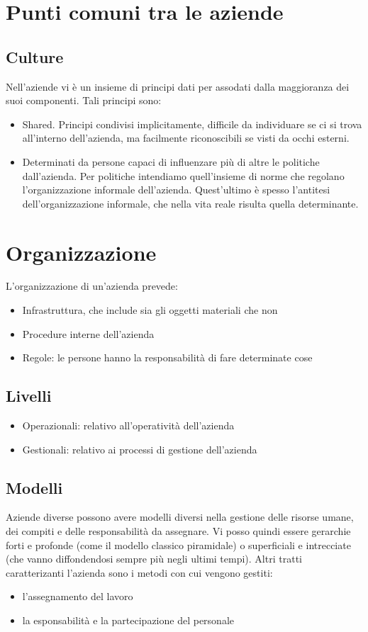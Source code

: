 \section{Punti comuni tra le aziende}
\subsection{Culture}
Nell'aziende vi \`e un insieme di principi dati per assodati dalla maggioranza dei suoi componenti. Tali principi sono:
\begin{itemize}
\item Shared. Principi condivisi implicitamente, difficile da individuare se ci si trova all'interno dell'azienda, ma facilmente riconoscibili se visti da occhi esterni.
\item Determinati da persone capaci di influenzare pi\`u di altre le politiche dall'azienda. Per politiche intendiamo quell'insieme di norme che regolano l'organizzazione informale dell'azienda.
Quest'ultimo \`e spesso l'antitesi dell'organizzazione informale, che nella vita reale risulta quella determinante.
\end{itemize}
\section{Organizzazione}
L'organizzazione di un'azienda prevede:
\begin{itemize}
	\item Infrastruttura, che include sia gli oggetti materiali che non
	\item Procedure interne dell'azienda
	\item Regole: le persone hanno la responsabilit\`a di fare determinate cose
\end{itemize}
\subsection{Livelli}
\begin{itemize}
	\item Operazionali: relativo all'operativit\`a dell'azienda
	\item Gestionali: relativo ai processi di gestione dell'azienda
\end{itemize}
\subsection{Modelli}
Aziende diverse possono avere modelli diversi nella gestione delle risorse umane, dei compiti e delle responsabilit\`a da assegnare. Vi posso quindi essere gerarchie forti e profonde (come il modello classico piramidale) o superficiali e intrecciate (che vanno diffondendosi sempre pi\`u negli ultimi tempi). Altri tratti caratterizanti l'azienda sono i metodi con cui vengono gestiti:
\begin{itemize}
	\item l'assegnamento del lavoro
	\item la esponsabilit\`a e la partecipazione del personale
\end{itemize}
